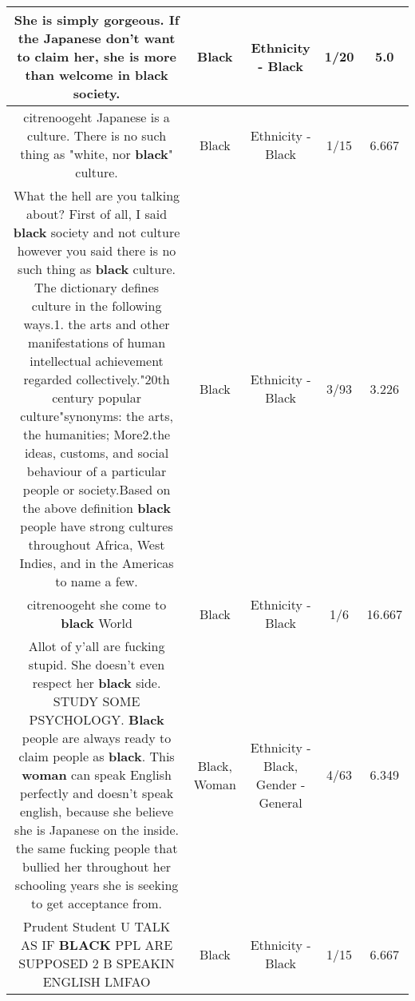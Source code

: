 \documentclass[11pt]{article}
\newlength\mylength
\begin{document}
\begin{center}
\begin{longtable}{|C{.65\mylength}|C{.30\mylength}|C{.12\mylength}|C{.12\mylength}|C{.12\mylength}|}
  \small She is simply gorgeous.  If the Japanese don't want to claim her, she is more than welcome in \textbf{black} society.\normalsize   & Black & Ethnicity - Black & 1/20 & 5.0 \\  \hline
  \small citrenoogeht Japanese is a culture. There is no such thing as "white, nor \textbf{black}" culture.\normalsize   & Black & Ethnicity - Black & 1/15 & 6.667 \\  \hline
  \small What the hell are you talking about?  First of all, I said \textbf{black} society and not culture however you said there is no such thing as \textbf{black} culture.  The dictionary defines culture in the following ways.1. the arts and other manifestations of human intellectual achievement regarded collectively."20th century popular culture"synonyms: the arts, the humanities; More2.the ideas, customs, and social behaviour of a particular people or society.Based on the above definition \textbf{black} people have strong cultures throughout Africa, West Indies, and in the Americas to name a few.\normalsize   & Black & Ethnicity - Black & 3/93 & 3.226 \\  \hline
  \small citrenoogeht she come to \textbf{black} World\normalsize   & Black & Ethnicity - Black & 1/6 & 16.667 \\  \hline
  \small Allot of y'all are fucking stupid. She doesn't even respect her \textbf{black} side. STUDY SOME PSYCHOLOGY. \textbf{Black} people are always ready to claim people as \textbf{black}. This \textbf{woman} can speak English perfectly and doesn't speak english, because she believe she is Japanese on the inside. the same fucking people that bullied her throughout her schooling years she is seeking to get acceptance from.\normalsize   & Black, Woman & Ethnicity - Black, Gender - General & 4/63 & 6.349 \\  \hline
  \small Prudent Student U TALK AS IF \textbf{BLACK} PPL ARE SUPPOSED 2 B SPEAKIN ENGLISH LMFAO\normalsize   & Black & Ethnicity - Black & 1/15 & 6.667 \\  \hline

\end{longtable}
\end{center}
\end{document}
